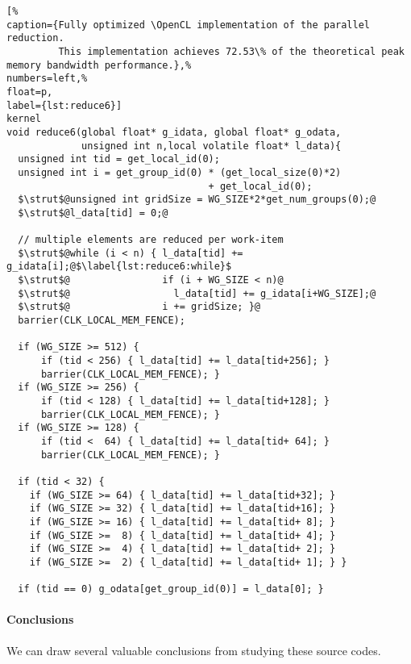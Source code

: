 \begin{lstlisting}[%                                                             
caption={Fully optimized \OpenCL implementation of the parallel reduction.
         This implementation achieves 72.53\% of the theoretical peak memory bandwidth performance.},%
numbers=left,%
float=p,
label={lst:reduce6}]
kernel
void reduce6(global float* g_idata, global float* g_odata,
             unsigned int n,local volatile float* l_data){
  unsigned int tid = get_local_id(0);
  unsigned int i = get_group_id(0) * (get_local_size(0)*2)
                                   + get_local_id(0);
  $\strut$@unsigned int gridSize = WG_SIZE*2*get_num_groups(0);@
  $\strut$@l_data[tid] = 0;@

  // multiple elements are reduced per work-item
  $\strut$@while (i < n) { l_data[tid] += g_idata[i];@$\label{lst:reduce6:while}$
  $\strut$@                if (i + WG_SIZE < n)@
  $\strut$@                  l_data[tid] += g_idata[i+WG_SIZE];@
  $\strut$@                i += gridSize; }@
  barrier(CLK_LOCAL_MEM_FENCE);

  if (WG_SIZE >= 512) {
      if (tid < 256) { l_data[tid] += l_data[tid+256]; }
      barrier(CLK_LOCAL_MEM_FENCE); }
  if (WG_SIZE >= 256) {
      if (tid < 128) { l_data[tid] += l_data[tid+128]; }
      barrier(CLK_LOCAL_MEM_FENCE); }
  if (WG_SIZE >= 128) {
      if (tid <  64) { l_data[tid] += l_data[tid+ 64]; }
      barrier(CLK_LOCAL_MEM_FENCE); }
  
  if (tid < 32) {
    if (WG_SIZE >= 64) { l_data[tid] += l_data[tid+32]; }
    if (WG_SIZE >= 32) { l_data[tid] += l_data[tid+16]; }
    if (WG_SIZE >= 16) { l_data[tid] += l_data[tid+ 8]; }
    if (WG_SIZE >=  8) { l_data[tid] += l_data[tid+ 4]; }
    if (WG_SIZE >=  4) { l_data[tid] += l_data[tid+ 2]; }
    if (WG_SIZE >=  2) { l_data[tid] += l_data[tid+ 1]; } }
  
  if (tid == 0) g_odata[get_group_id(0)] = l_data[0]; }
\end{lstlisting}


\paragraph{Conclusions}
We can draw several valuable conclusions from studying these \OpenCL source codes.

